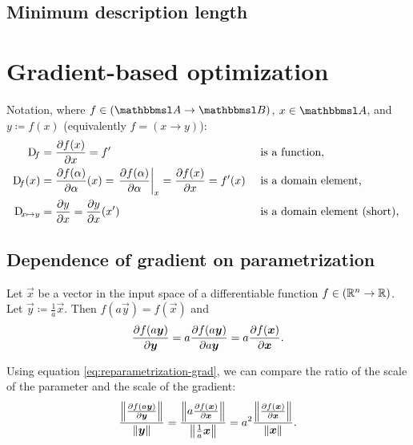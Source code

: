 \documentclass{article}
\begin{document}
\subsection{Minimum description length}


\section{Gradient-based optimization}

Notation, where $f\in(\set A\to\set B)$, $x\in \set A$, and $y \coloneqq f(x)$ (equivalently $f=(x\to y)$):
\begin{align}
    \Dif_f &= \pd{f(x)}{x} = f' &&\text{ is a function,} \\
    \Dif_f(x) &= \pd{f(\alpha)}{\alpha}(x) = \eval{\pd{f(\alpha)}{\alpha}}_{x} = \pd{f(x)}{x} = f'(x) &&\text{ is a domain element, } \\
    \Dif_{x\mapsto y} &= \pd{y}{x} = \pd{y}{x}(x') &&\text{ is a domain element (short), }
\end{align}

\subsection{Dependence of gradient on parametrization}

Let $\vec x$ be a vector in the input space of a differentiable function $f\in\del{\R^n\to\R}$. Let $\vec y \coloneqq \frac{1}{a}\vec x$. Then $f(a\vec y)=f(\vec x)$ and
\begin{align}
    \pd{f\del{a\vec y}}{\vec y} = a\pd{f(a\vec y)}{a\vec y} = a\pd{f(\vec x)}{\vec x} \text{.}  \label{eq:reparametrization-grad}
\end{align}

Using equation \eqref{eq:reparametrization-grad}, we can compare the ratio of the scale of the parameter and the scale of the gradient:
\begin{align}
    \frac{\enVert{\pd{f\del{a\vec y}}{\vec y}}}{\enVert{\vec y}}
    = \frac{\enVert{a\pd{f(\vec x)}{\vec x}}}{\enVert{\frac{1}{a}\vec x}}
    = a^2\frac{\enVert{\pd{f(\vec x)}{\vec x}}}{\enVert{\vec x}} \text{.}
\end{align}
\end{document}
